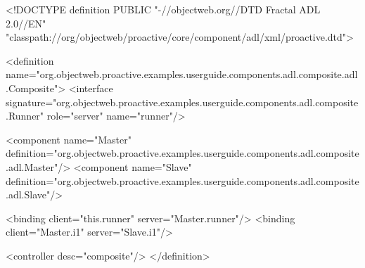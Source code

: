 <!DOCTYPE definition PUBLIC "-//objectweb.org//DTD Fractal ADL 2.0//EN" "classpath://org/objectweb/proactive/core/component/adl/xml/proactive.dtd">

<definition name="org.objectweb.proactive.examples.userguide.components.adl.composite.adl.Composite">
  <interface signature="org.objectweb.proactive.examples.userguide.components.adl.composite.Runner" role="server" name="runner"/>

  <component name="Master" definition="org.objectweb.proactive.examples.userguide.components.adl.composite.adl.Master"/>
  <component name="Slave" definition="org.objectweb.proactive.examples.userguide.components.adl.composite.adl.Slave"/>

  <binding client="this.runner" server="Master.runner"/>
  <binding client="Master.i1" server="Slave.i1"/>

  <controller desc="composite"/>
</definition>